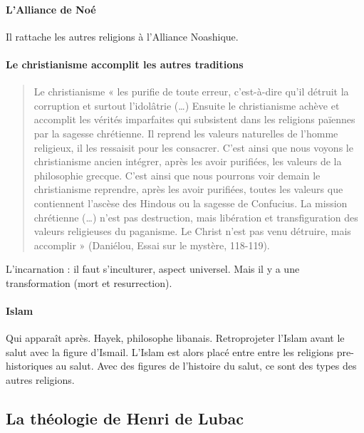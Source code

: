           
    \paragraph{L'Alliance de Noé} Il rattache les autres religions à l'Alliance Noashique.  
      \paragraph{Le christianisme accomplit les autres traditions}
      
      \begin{quote}
          Le  christianisme  «  les  purifie  de  toute  erreur,  c’est-à-dire  qu’il  détruit  la  corruption  et  surtout l’idolâtrie  (…)  Ensuite  le  christianisme  achève  et  accomplit  les  vérités  imparfaites  qui  subsistent  dans les  religions  païennes  par  la  sagesse  chrétienne.  Il  reprend  les  valeurs  naturelles  de  l’homme  religieux, il  les  ressaisit  pour  les  consacrer.  C’est  ainsi  que  nous  voyons  le  christianisme  ancien  intégrer,  après les  avoir  purifiées,  les  valeurs  de  la  philosophie  grecque.  C’est  ainsi  que  nous  pourrons  voir  demain  le christianisme  reprendre,  après  les  avoir  purifiées,  toutes  les  valeurs  que  contiennent  l’ascèse  des Hindous  ou  la  sagesse  de  Confucius.  La  mission  chrétienne  (…)  n’est  pas  destruction,  mais  libération et  transfiguration  des  valeurs  religieuses  du  paganisme.  Le  Christ  n’est  pas  venu  détruire,  mais accomplir  »  (Daniélou,  Essai  sur  le  mystère, 118-119). 
      \end{quote}
 L'incarnation : il faut s'inculturer, aspect universel. Mais il y a une transformation (mort et resurrection). 
 
 \paragraph{Islam} Qui apparaît après. Hayek, philosophe libanais. Retroprojeter l'Islam avant le salut avec la figure d'Ismail. L'Islam est alors placé entre entre les religions pre-historiques au salut. Avec des figures de l'histoire du salut, ce sont des types des autres religions. 
    
    \subsection{La théologie de Henri de Lubac}
    

